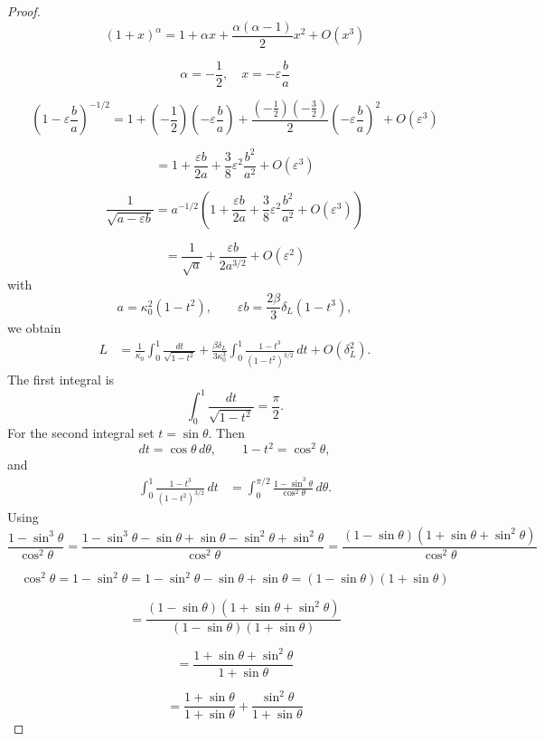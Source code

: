 \documentclass[11pt,a4paper]{report}
\begin{document}
\begin{proof}
		\[
		(1+x)^\alpha = 1 + \alpha x + \frac{\alpha(\alpha-1)}{2}x^2 + O(x^3)
		\]
		
		\[
		\alpha = -\frac{1}{2}, 
		\quad x = -\varepsilon \frac{b}{a}
		\]
		
		\[
		\left(1-\varepsilon \frac{b}{a}\right)^{-1/2}
		= 1 + \left(-\frac{1}{2}\right)\left(-\varepsilon \frac{b}{a}\right)
		+ \frac{\left(-\frac{1}{2}\right)\left(-\frac{3}{2}\right)}{2}
		\left(-\varepsilon \frac{b}{a}\right)^2
		+ O(\varepsilon^3)
		\]
		
		\[
		= 1 + \frac{\varepsilon b}{2a}
		+ \frac{3}{8}\varepsilon^2 \frac{b^2}{a^2}
		+ O(\varepsilon^3)
		\]
		
		\[
		\frac{1}{\sqrt{a-\varepsilon b}}
		= a^{-1/2}\left(
		1 + \frac{\varepsilon b}{2a}
		+ \frac{3}{8}\varepsilon^2 \frac{b^2}{a^2}
		+ O(\varepsilon^3)
		\right)
		\]
		
		\[
		= \frac{1}{\sqrt{a}}
		+ \frac{\varepsilon b}{2a^{3/2}}
		+ O(\varepsilon^2)
		\]
		with
		\[
		a=\kappa_0^2(1-t^2),
		\qquad
		\varepsilon b=
		\frac{2\beta}{3}\delta_L(1-t^3),
		\]
		we obtain
		\begin{align}
			L
			&=
			\frac{1}{\kappa_0}
			\int_0^1
			\frac{dt}{\sqrt{1-t^2}}
			+
			\frac{\beta\delta_L}{3\kappa_0^3}
			\int_0^1
			\frac{1-t^3}{(1-t^2)^{3/2}}\,dt
			+
			O(\delta_L^2).
			\label{eq:L_delta_expand_explicit}
		\end{align}	
		The first integral is
		\[
		\int_0^1\frac{dt}{\sqrt{1-t^2}}
		=
		\frac{\pi}{2}.
		\]
		For the second integral set $t=\sin\theta$.  Then
		\[
		dt=\cos\theta\,d\theta,
		\qquad
		1-t^2=\cos^2\theta,
		\]
		and
		\begin{align}
			\int_0^1
			\frac{1-t^3}{(1-t^2)^{3/2}}\,dt
			&=
			\int_0^{\pi/2}
			\frac{1-\sin^3\theta}{\cos^2\theta}\,d\theta.
		\end{align}
		Using
		\[
		\frac{1-\sin^3\theta}{\cos^2\theta}
		=\frac{1-\sin^3\theta-\sin\theta+\sin\theta-\sin^2\theta+\sin^2\theta}{\cos^2\theta}
		= \frac{(1-\sin\theta)(1+\sin\theta+\sin^2\theta)}{\cos^2\theta}
		\]
		
		\[
		\cos^2\theta = 1-\sin^2\theta = 1-\sin^2\theta-\sin\theta+\sin\theta = (1-\sin\theta)(1+\sin\theta)
		\]
		
		\[
		= \frac{(1-\sin\theta)(1+\sin\theta+\sin^2\theta)}{(1-\sin\theta)(1+\sin\theta)}
		\]
		
		\[
		= \frac{1+\sin\theta+\sin^2\theta}{1+\sin\theta}
		\]
		
		\[
		= \frac{1+\sin\theta}{1+\sin\theta} + \frac{\sin^2\theta}{1+\sin\theta}
		\]
		

\end{proof}
\end{document}
